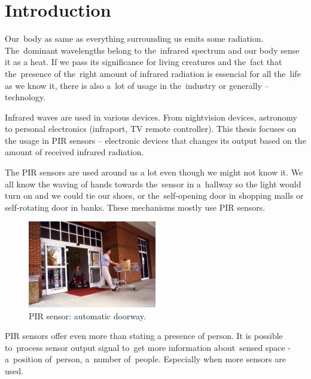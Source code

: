 
\chapter{Introduction}
\label{chapter:introduction}


Our~body as same as everything surrounding us emits some radiation. The~dominant wavelengths
belong to the~infrared spectrum and our body sense it as a heat. If we pass its significance
for living creatures and the~fact that the~presence of the~right amount of infrared radiation
is essencial for all the~life as we know it, there is also a~lot of usage in the~industry or
generally -- technology.

Infrared waves are used in various devices. From nightvision devices, astronomy to personal
electronics (infraport, TV remote controller). This thesis focuses on the usage in PIR
sensors -- electronic devices that changes its output based on the amount of received infrared
radiation.

The PIR sensors are used around us a lot even though we might not know it. We all know the waving
of hands towards the~sensor in a~hallway so the light would turn on and we could tie our shoes,
or the~self-opening door in shopping malls or self-rotating door in banks. These mechanisms mostly
use PIR sensors.

\begin{figure}[h!]
  \begin{center}
    \includegraphics[width=0.5\textwidth]{obrazky-figures/automaticdoorway.jpg}
    \caption{PIR sensor: automatic doorway. \cite{automaticdoorway} \label{fig:automaticdoorway}}
  \end{center}
\end{figure}

PIR sensors offer even more than stating a presence of person. It is possible to~process sensor
output signal to~get more information about~sensed space - a~position of~person, a~number of~people.
Especially when more sensors are used.






